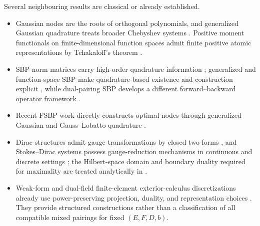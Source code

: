 \documentclass[11pt,a4paper]{article}
\theoremstyle{definition}
\theoremstyle{remark}
\begin{document}
Several neighbouring results are classical or already established.
\begin{itemize}
\item Gaussian nodes are the roots of orthogonal polynomials, and generalized Gaussian
quadrature treats broader Chebyshev systems \cite{szego1975,gautschi2004,karlinstudden1966}.
Positive moment functionals on finite-dimensional function spaces admit finite positive
atomic representations by Tchakaloff's theorem \cite{tchakaloff1957,bayerteichmann2006}.
\item SBP norm matrices carry high-order quadrature information
\cite{hickenzingg2013}; generalized and function-space SBP make quadrature-based existence
and construction explicit \cite{delrey2014,glaubitz2023}, while dual-pairing SBP develops a
different forward--backward operator framework \cite{williamsduru2024}.
\item Recent FSBP work directly constructs optimal nodes through generalized Gaussian and
Gauss--Lobatto quadrature \cite{hale2026,bercik2026}.
\item Dirac structures admit gauge transformations by closed two-forms
\cite{bursztynradko2003}, and Stokes--Dirac systems possess gauge-reduction mechanisms in
continuous and discrete settings \cite{seslija2012}; the Hilbert-space domain and boundary
duality required for maximality are treated analytically in \cite{brugnoli2023}.
\item Weak-form and dual-field finite-element exterior-calculus discretizations already use
power-preserving projection, duality, and representation choices
\cite{kotyczka2018,brugnolirashad2022}.  They provide structured constructions rather than a
classification of all compatible mixed pairings for fixed $(E,F,D,b)$.
\end{itemize}
\end{document}
